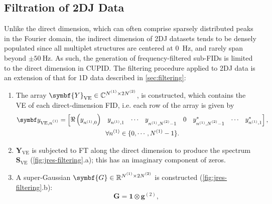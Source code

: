 \subsection{Filtration of \ac{2DJ} Data}
\label{subsec:jres-filtering}
Unlike the direct dimension, which can often comprise sparsely distributed
peaks in the Fourier domain, the indirect dimension of \ac{2DJ} datasets tends
to be densely populated since all multiplet structures are centered at
\qty{0}{\hertz}, and rarely span beyond $\pm \qty{50}{\hertz}$. As such,
the generation of frequency-filtered sub-\acp{FID} is limited to
the direct dimension in \ac{CUPID}.
The filtering procedure applied to \ac{2DJ} data is an extension of that
for \ac{1D} data described in \cref{sec:filtering}:
\begin{enumerate}
    \item The array $\symbf{Y}_{\text{VE}} \in \mathbb{C}^{\None \times 2
        \Ntwo}$, is constructed, which contains the \ac{VE} of each
        direct-dimension \ac{FID}, i.e. each row of the array is given by
        \begin{equation}
            \begin{gathered}
            \by_{\text{VE},\none} =
                \begin{bmatrix}
                    \Re\left(y_{n^{(1)}, 0}^{\vphantom{*}}\right) &
                    y_{n^{(1)}, 1}^{\vphantom{*}} &
                    \cdots &
                    y_{n^{(1)}, \Ntwo - 1}^{\vphantom{*}} &
                    0 &
                    y_{n^{(1)}, \Ntwo - 1}^* &
                    \cdots &
                    y_{n^{(1)}, 1}^*
                \end{bmatrix},\\
                \forall n^{(1)} \in \lbrace 0, \cdots, N^{(1)} - 1 \rbrace.
            \end{gathered}
        \end{equation}
    \item $\symbf{Y}_{\text{VE}}$ is subjected to \ac{FT} along the direct
        dimension to produce the spectrum  $\symbf{S}_{\text{VE}}$
        (\cref{fig:jres-filtering}.a); this has an imaginary component of
        zeros.
    \item A super-Gaussian $\symbf{G} \in \mathbb{R}^{\None \times 2 \Ntwo}$ is
        constructed
        (\cref{fig:jres-filtering}.b):
        \begin{equation}
            \symbf{G} = \symbf{1} \otimes \symbf{g}^{(2)},
        \end{equation}

\end{enumerate}
